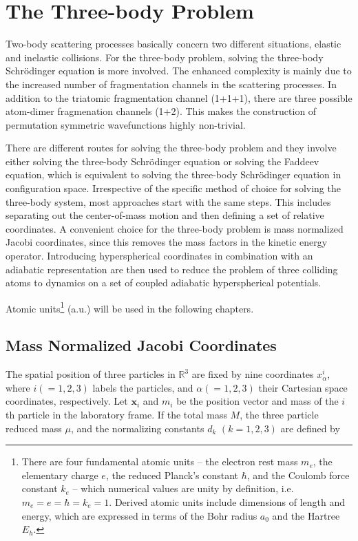 \chapter{The Three-body Problem}
Two-body scattering processes basically concern two different situations, elastic and inelastic collisions. For the three-body problem, solving the three-body Schr{\"o}dinger equation is more involved. The enhanced complexity is mainly due to the increased number of fragmentation channels in the scattering processes. In addition to the triatomic fragmentation channel (1+1+1), there are three possible atom-dimer fragmenation channels (1+2). This makes the construction of permutation symmetric wavefunctions highly non-trivial. 

There are different routes for solving the three-body problem and they involve either solving the three-body Schr{\"o}dinger equation or solving the Faddeev equation, which is equivalent to solving the three-body Schr{\"o}dinger equation in configuration space. Irrespective of the specific method of choice for solving the three-body system, most approaches start with the same steps. This includes separating out the center-of-mass motion and then defining a set of relative coordinates. A convenient choice for the three-body problem is mass normalized Jacobi coordinates, since this removes the mass factors in the kinetic energy operator. Introducing hyperspherical coordinates in combination with an adiabatic representation are then used to reduce the problem of three colliding atoms to dynamics on a set of coupled adiabatic hyperspherical potentials.

Atomic units\footnote{There are four fundamental atomic units -- the electron rest mass $m_e$, the elementary charge $e$, the reduced Planck's constant $\hbar$, and the Coulomb force constant $k_e$ -- which numerical values are unity by definition, i.e. $m_e = e = \hbar = k_e = 1$. Derived atomic units include dimensions of length and energy, which are expressed in terms of the Bohr radius $a_0$ and the Hartree $E_h$.    } (a.u.) will be used in the following chapters. 

\section{Mass Normalized Jacobi Coordinates}\label{MNJC}
The spatial position of three particles in $\mathbb{R}^3$ are fixed by nine coordinates $x_{\alpha}^{i}$, where $i(=1,2,3)$ labels the particles, and $\alpha(=1,2,3)$ their Cartesian space coordinates, respectively. Let $\mathbf{x}_i$ and $m_{i}$ be the position vector and mass of the $i$th particle in the laboratory frame. If the total mass $M$, the three particle reduced mass $\mu$, and the normalizing constants $d_{k}$ $(k=1,2,3)$ are defined by

